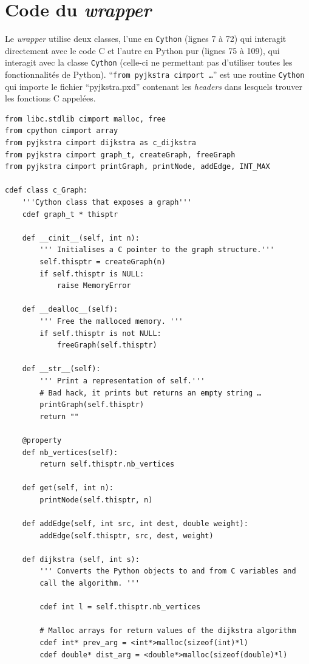 \documentclass{article}
\begin{document}
\section{Code du \emph{wrapper}}\label{sec:code-du-wrapper}
Le \emph{wrapper} utilise deux classes, l'une en \texttt{Cython} (lignes 7 à 72) qui
interagit directement avec le code C et l'autre en Python pur (lignes
75 à 109), qui interagit avec la classe \texttt{Cython} (celle-ci ne permettant
pas d'utiliser toutes les fonctionnalités de Python). ``\texttt{from pyjkstra cimport …}''
est une routine \texttt{Cython} qui importe le fichier ``pyjkstra.pxd''
contenant les \emph{headers} dans lesquels trouver les fonctions C appelées.
\begin{verbatim}
from libc.stdlib cimport malloc, free
from cpython cimport array
from pyjkstra cimport dijkstra as c_dijkstra
from pyjkstra cimport graph_t, createGraph, freeGraph
from pyjkstra cimport printGraph, printNode, addEdge, INT_MAX

cdef class c_Graph:
    '''Cython class that exposes a graph'''
    cdef graph_t * thisptr

    def __cinit__(self, int n):
        ''' Initialises a C pointer to the graph structure.'''
        self.thisptr = createGraph(n)
        if self.thisptr is NULL:
            raise MemoryError

    def __dealloc__(self):
        ''' Free the malloced memory. '''
        if self.thisptr is not NULL:
            freeGraph(self.thisptr)

    def __str__(self):
        ''' Print a representation of self.'''
        # Bad hack, it prints but returns an empty string …
        printGraph(self.thisptr)
        return ""

    @property
    def nb_vertices(self):
        return self.thisptr.nb_vertices

    def get(self, int n):
        printNode(self.thisptr, n)

    def addEdge(self, int src, int dest, double weight):
        addEdge(self.thisptr, src, dest, weight)

    def dijkstra (self, int s):
        ''' Converts the Python objects to and from C variables and
        call the algorithm. '''

        cdef int l = self.thisptr.nb_vertices

        # Malloc arrays for return values of the dijkstra algorithm
        cdef int* prev_arg = <int*>malloc(sizeof(int)*l)
        cdef double* dist_arg = <double*>malloc(sizeof(double)*l)


\end{verbatim}
\end{document}
